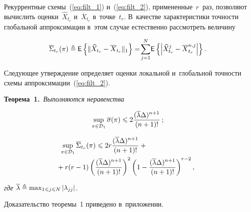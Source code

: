 \begin{multicols}{2}
 Рекуррентные схемы~(\ref{eq:filt_1}) и~(\ref{eq:filt_2}), примененные~$r$~раз, 
 позволяют вычислить оценки~$\widehat{X}_{t_r}$ и~$\overline{X}_{t_r}$ 
 в~точке~$t_r$. В~качестве характеристики точности глобальной аппроксимации в~этом 
 случае естественно рассмотреть величину
 
 \vspace*{-2pt}
 
 \noindent
 \begin{equation*}
 \overline{\Sigma}_{t_r}(\pi) \triangleq {\sf E}
 \left\{\|\widehat{X}_{t_{r}} - \overline{X}_{t_{r}}\|_{1}\right\} = 
 \!\sum\limits_{j=1}^N\!{\sf E}
 \left\{\left\vert \widehat{X}^j_{t_{r}} - 
 \overline{X}^{n,j}_{t_{r}}\right\vert \right\}.
 \end{equation*}
 
 Следующее утверждение определяет оценки локальной и~глобальной 
 точности схемы аппроксимации~(\ref{eq:filt_2}).
 
 
 \noindent
 \textbf{Теорема~1.}\
\textit{Выполняются неравенства} 


\noindent
 \begin{equation}
 \sup_{\pi \in \mathcal{D}_1} \overline{\sigma}(\pi) 
 \leqslant 2 \displaystyle\frac{\displaystyle (\overline{\lambda}\Delta)^{n+1}\mathstrut}{\displaystyle (n+1)!\mathstrut}\,;
 \label{eq:prec_loc}
\end{equation}

\noindent
\begin{align}
  \sup\limits_{\pi \in \mathcal{D}_1} \overline{\Sigma}_{t_r}(\pi)
   &\leqslant 2r \fr{(\overline{\lambda}\Delta)^{n+1}}{(n+1)!} +{}\notag\\[-0.5pt]
   &\hspace*{-20mm}{}+
  r(r-1)\left(
  \fr{(\overline{\lambda}\Delta)^{n+1}}{(n+1)!}
  \right)^2
  \left(
  1-\fr{(\overline{\lambda}\Delta)^{n+1}}{(n+1)!}
  \right)^{r-2},
 \label{eq:prec_glob}
 \end{align}
 
 \vspace*{-2pt}
 
 \noindent
 \textit{где} $\overline{\lambda} \triangleq \max_{1 \leqslant j \leqslant N}|\lambda_{jj}|$.



 Доказательство теоремы~1 приведено в~приложении.
 

\end{multicols}
